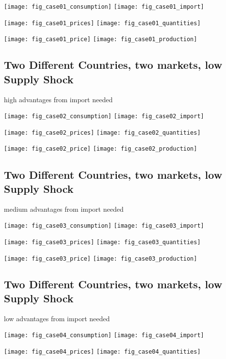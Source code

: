 \documentclass{article}
\begin{document}
\vskip2mm
\hskip-1cm
\texttt{[image: fig\_case01\_consumption]}
\texttt{[image: fig\_case01\_import]}

\noindent
\vskip-5mm
\hskip-1cm
\texttt{[image: fig\_case01\_prices]}
\texttt{[image: fig\_case01\_quantities]}

\noindent
\vskip-5mm
\hskip-1cm
\texttt{[image: fig\_case01\_price]}
\texttt{[image: fig\_case01\_production]}

\newpage
\subsection{Two Different Countries, two markets, low Supply Shock}
high advantages from import needed

\vskip2mm
\hskip-1cm
\texttt{[image: fig\_case02\_consumption]}
\texttt{[image: fig\_case02\_import]}

\noindent
\vskip-5mm
\hskip-1cm
\texttt{[image: fig\_case02\_prices]}
\texttt{[image: fig\_case02\_quantities]}

\noindent
\vskip-5mm
\hskip-1cm
\texttt{[image: fig\_case02\_price]}
\texttt{[image: fig\_case02\_production]}

\newpage


\subsection{Two Different Countries, two markets, low Supply Shock}
medium advantages from import needed

\vskip2mm
\hskip-1cm
\texttt{[image: fig\_case03\_consumption]}
\texttt{[image: fig\_case03\_import]}

\noindent
\vskip-5mm
\hskip-1cm
\texttt{[image: fig\_case03\_prices]}
\texttt{[image: fig\_case03\_quantities]}

\noindent
\vskip-5mm
\hskip-1cm
\texttt{[image: fig\_case03\_price]}
\texttt{[image: fig\_case03\_production]}

\newpage

\subsection{Two Different Countries, two markets, low Supply Shock}
low advantages from import needed

\vskip2mm
\hskip-1cm
\texttt{[image: fig\_case04\_consumption]}
\texttt{[image: fig\_case04\_import]}

\noindent
\vskip-5mm
\hskip-1cm
\texttt{[image: fig\_case04\_prices]}
\texttt{[image: fig\_case04\_quantities]}
\end{document}
